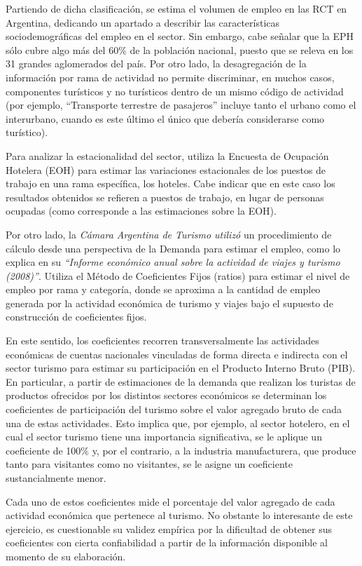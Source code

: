 \documentclass[
  openany]{book}
\begin{document}
Partiendo de dicha clasificación, se estima el volumen de empleo en las RCT en Argentina, dedicando un apartado a describir las características sociodemográficas del empleo en el sector. Sin embargo, cabe señalar que la EPH sólo cubre algo más del 60\% de la población nacional, puesto que se releva en los 31 grandes aglomerados del país. Por otro lado, la desagregación de la información por rama de actividad no permite discriminar, en muchos casos, componentes turísticos y no turísticos dentro de un mismo código de actividad (por ejemplo, ``Transporte terrestre de pasajeros'' incluye tanto el urbano como el interurbano, cuando es este último el único que debería considerarse como turístico).

Para analizar la estacionalidad del sector, utiliza la Encuesta de Ocupación Hotelera (EOH) para estimar las variaciones estacionales de los puestos de trabajo en una rama específica, los hoteles. Cabe indicar que en este caso los resultados obtenidos se refieren a puestos de trabajo, en lugar de personas ocupadas (como corresponde a las estimaciones sobre la EOH).

Por otro lado, la \emph{Cámara Argentina de Turismo utilizó} un procedimiento de cálculo desde una perspectiva de la Demanda para estimar el empleo, como lo explica en su \emph{``Informe económico anual sobre la actividad de viajes y turismo (2008)''}. Utiliza el Método de Coeficientes Fijos (ratios) para estimar el nivel de empleo por rama y categoría, donde se aproxima a la cantidad de empleo generada por la actividad económica de turismo y viajes bajo el supuesto de construcción de coeficientes fijos.

En este sentido, los coeficientes recorren transversalmente las actividades económicas de cuentas nacionales vinculadas de forma directa e indirecta con el sector turismo para estimar su participación en el Producto Interno Bruto (PIB). En particular, a partir de estimaciones de la demanda que realizan los turistas de productos ofrecidos por los distintos sectores económicos se determinan los coeficientes de participación del turismo sobre el valor agregado bruto de cada una de estas actividades. Esto implica que, por ejemplo, al sector hotelero, en el cual el sector turismo tiene una importancia significativa, se le aplique un coeficiente de 100\% y, por el contrario, a la industria manufacturera, que produce tanto para visitantes como no visitantes, se le asigne un coeficiente sustancialmente menor.

Cada uno de estos coeficientes mide el porcentaje del valor agregado de cada actividad económica que pertenece al turismo. No obstante lo interesante de este ejercicio, es cuestionable su validez empírica por la dificultad de obtener sus coeficientes con cierta confiabilidad a partir de la información disponible al momento de su elaboración.
\end{document}
